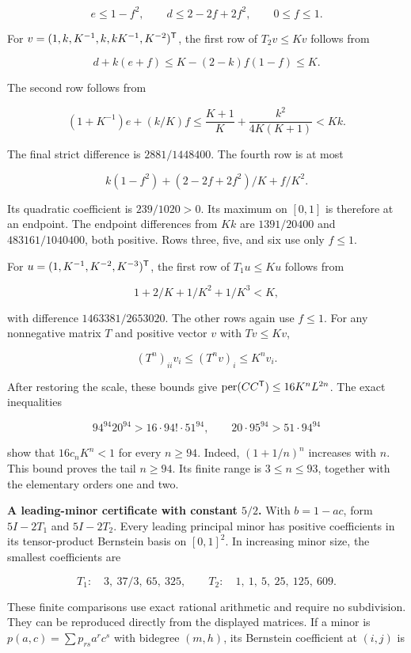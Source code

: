 \[
e\le1-f^2,\qquad d\le2-2f+2f^2,\qquad 0\le f\le1.
\]

For \(v=(1,k,K^{-1},k,kK^{-1},K^{-2})^{\mathsf{T}}\), the first row of \(T_2v\le Kv\) follows from

\[
d+k(e+f)\le K-(2-k)f(1-f)\le K.
\]

The second row follows from

\[
(1+K^{-1})e+(k/K)f
\le\frac{K+1}{K}+\frac{k^2}{4K(K+1)}<Kk.
\]

The final strict difference is \(2881/1448400\). The fourth row is at most

\[
k(1-f^2)+(2-2f+2f^2)/K+f/K^2.
\]

Its quadratic coefficient is \(239/1020>0\). Its maximum on \([0,1]\) is therefore at an endpoint. The endpoint differences from \(Kk\) are \(1391/20400\) and \(483161/1040400\), both positive. Rows three, five, and six use only \(f\le1\).

For \(u=(1,K^{-1},K^{-2},K^{-3})^{\mathsf{T}}\), the first row of \(T_1u\le Ku\) follows from

\[
1+2/K+1/K^2+1/K^3<K,
\]

with difference \(1463381/2653020\). The other rows again use \(f\le1\). For any nonnegative matrix \(T\) and positive vector \(v\) with \(Tv\le Kv\),

\[
(T^n)_{ii}v_i\le(T^nv)_i\le K^nv_i.
\]

After restoring the scale, these bounds give \(\operatorname{per}(CC^{\mathsf{T}})\le16K^nL^{2n}\). The exact inequalities

\[
94^{94}20^{94}>16\cdot94!\cdot51^{94},\qquad
20\cdot95^{94}>51\cdot94^{94}
\]

show that \(16c_nK^n<1\) for every \(n\ge94\). Indeed, \((1+1/n)^n\) increases with \(n\). This bound proves the tail \(n\ge94\). Its finite range is \(3\le n\le93\), together with the elementary orders one and two.

\textbf{A leading-minor certificate with constant \(5/2\).} With \(b=1-ac\), form \(5I-2T_1\) and \(5I-2T_2\). Every leading principal minor has positive coefficients in its tensor-product Bernstein basis on \([0,1]^2\). In increasing minor size, the smallest coefficients are

\[
T_1:\quad 3,\ 37/3,\ 65,\ 325,
\qquad
T_2:\quad 1,\ 1,\ 5,\ 25,\ 125,\ 609.
\]

These finite comparisons use exact rational arithmetic and require no subdivision. They can be reproduced directly from the displayed matrices. If a minor is \(p(a,c)=\sum p_{rs}a^rc^s\) with bidegree \((m,h)\), its Bernstein coefficient at \((i,j)\) is


